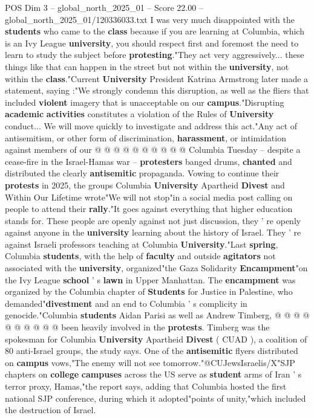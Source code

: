 \begin{textsample}{POS Dim 3 – global\_north\_2025\_01 – Score 22.00 – global\_north\_2025\_01/120336033.txt}
I was very much disappointed with the \textbf{students} who came to the \textbf{class} because if you are learning at Columbia, which is an Ivy League \textbf{university}, you should respect first and foremost the need to learn to study the subject before \textbf{protesting}."They act very aggressively... these things like that can happen in the street but not within the \textbf{university}, not within the \textbf{class}."Current \textbf{University} President Katrina Armstrong later made a statement, saying :"We strongly condemn this disruption, as well as the fliers that included \textbf{violent} imagery that is unacceptable on our \textbf{campus}."Disrupting \textbf{academic} \textbf{activities} constitutes a violation of the Rules of \textbf{University} conduct...
We will move quickly to investigate and address this act."Any act of antisemitism, or other form of discrimination, \textbf{harassment}, or intimidation against members of our @ @ @ @ @ @ @ @ @ @ Columbia Tuesday -- despite a cease-fire in the Israel-Hamas war -- \textbf{protesters} banged drums, \textbf{chanted} and distributed the clearly \textbf{antisemitic} propaganda.
Vowing to continue their \textbf{protests} in 2025, the groups Columbia \textbf{University} Apartheid \textbf{Divest} and Within Our Lifetime wrote"We will not stop"in a social media post calling on people to attend their \textbf{rally}."It goes against everything that higher education stands for.
These people are openly against not just discussion, they ' re openly against anyone in the \textbf{university} learning about the history of Israel.
They ' re against Israeli professors teaching at Columbia \textbf{University}."Last \textbf{spring}, Columbia \textbf{students}, with the help of \textbf{faculty} and outside \textbf{agitators} not associated with the \textbf{university}, organized"the Gaza Solidarity \textbf{Encampment}"on the Ivy League \textbf{school} ' s \textbf{lawn} in Upper Manhattan.
The \textbf{encampment} was organized by the Columbia chapter of \textbf{Students} for Justice in Palestine, who demanded"\textbf{divestment} and an end to Columbia ' s complicity in genocide."Columbia \textbf{students} Aidan Parisi as well as Andrew Timberg, @ @ @ @ @ @ @ @ @ @ been heavily involved in the \textbf{protests}.
Timberg was the spokesman for Columbia \textbf{University} Apartheid \textbf{Divest} ( CUAD ), a coalition of 80 anti-Israel groups, the study says.
One of the \textbf{antisemitic} flyers distributed on \textbf{campus} vows,"The enemy will not see tomorrow."@CUJewsIsraelis/X"SJP chapters on \textbf{college} \textbf{campuses} across the US serve as \textbf{student} arms of Iran ' s terror proxy, Hamas,"the report says, adding that Columbia hosted the first national SJP conference, during which it adopted"points of unity,"which included the destruction of Israel.

\end{textsample}
